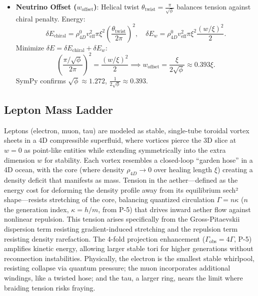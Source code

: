 \begin{itemize}
\item \textbf{Neutrino Offset (\(w_{\text{offset}}\))}: Helical twist \(\theta_{\text{twist}} = \frac{\pi}{\sqrt{\phi}}\) balances tension against chiral penalty. Energy:
  \[
  \delta E_{\text{chiral}} = \rho_{4D}^0 v_{\text{eff}}^2 \pi \xi^2 \left( \frac{\theta_{\text{twist}}}{2\pi} \right)^2, \quad \delta E_w = \rho_{4D}^0 v_{\text{eff}}^2 \pi \xi^2 \frac{(w / \xi)^2}{2}.
  \]
  Minimize \(\delta E = \delta E_{\text{chiral}} + \delta E_w\):
  \[
  \left( \frac{\pi / \sqrt{\phi}}{2\pi} \right)^2 = \frac{(w / \xi)^2}{2} \implies w_{\text{offset}} = \frac{\xi}{2 \sqrt{\phi}} \approx 0.393 \xi.
  \]
  SymPy confirms \(\sqrt{\phi} \approx 1.272\), \(\frac{1}{2 \sqrt{\phi}} \approx 0.393\).
\end{itemize}


\subsection{Lepton Mass Ladder}

Leptons (electron, muon, tau) are modeled as stable, single-tube toroidal vortex sheets in a 4D compressible superfluid, where vortices pierce the 3D slice at $w=0$ as point-like entities while extending symmetrically into the extra dimension $w$ for stability. Each vortex resembles a closed-loop ``garden hose'' in a 4D ocean, with the core (where density $\rho_{4D} \to 0$ over healing length $\xi$) creating a density deficit that manifests as mass. Tension in the aether—defined as the energy cost for deforming the density profile away from its equilibrium sech² shape—resists stretching of the core, balancing quantized circulation $\Gamma = n \kappa$ ($n$ the generation index, $\kappa = h / m$, from P-5) that drives inward aether flow against nonlinear repulsion. This tension arises specifically from the Gross-Pitaevskii dispersion term resisting gradient-induced stretching and the repulsion term resisting density rarefaction. The 4-fold projection enhancement ($\Gamma_{\text{obs}} = 4\Gamma$, P-5) amplifies kinetic energy, allowing larger stable tori for higher generations without reconnection instabilities. Physically, the electron is the smallest stable whirlpool, resisting collapse via quantum pressure; the muon incorporates additional windings, like a twisted hose; and the tau, a larger ring, nears the limit where braiding tension risks fraying.

